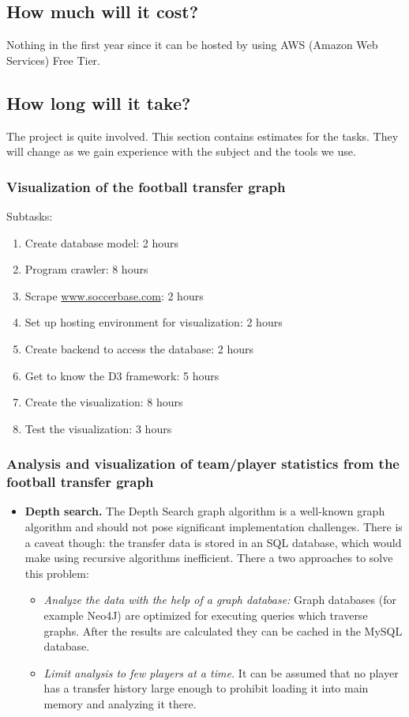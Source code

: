 \documentclass{article}
\begin{document}
\subsection{How much will it cost?}

Nothing in the first year since it can be hosted by using AWS (Amazon Web Services) Free Tier.

\subsection{How long will it take?}

The project is quite involved. This section contains estimates for the tasks. They will change as we gain experience with the subject and the tools we use.

\subsubsection{Visualization of the football transfer graph}

Subtasks:
\begin{enumerate}
\item Create database model: 2 hours
\item Program crawler: 8 hours
\item Scrape \url{www.soccerbase.com}: 2 hours
\item Set up hosting environment for visualization: 2 hours
\item Create backend to access the database: 2 hours
\item Get to know the D3 framework: 5 hours
\item Create the visualization: 8 hours
\item Test the visualization: 3 hours
\end{enumerate}

\subsubsection{Analysis and visualization of team/player statistics from the football transfer graph}

\begin{itemize}
\item \textbf{Depth search.} The Depth Search graph algorithm is a well-known graph algorithm and should not pose significant implementation challenges. There is a caveat though: the transfer data is stored in an SQL database, which would make using recursive algorithms inefficient. There a two approaches to solve this problem:
	\begin{itemize}
	\item \textit{Analyze the data with the help of a graph database:} Graph databases (for example Neo4J) are optimized for executing queries which traverse graphs. After the results are calculated they can be cached in the MySQL database.
	\item \textit{Limit analysis to few players at a time.} It can be assumed that no player has a transfer history large enough to prohibit loading it into main memory and analyzing it there.
	\end{itemize}
\end{itemize}
\end{document}

